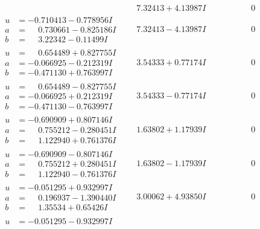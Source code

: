 \documentclass[1p]{elsarticle_modified}
\theoremstyle{definition}
\begin{document}
$$\begin{array}{c|c|c}
 & \phantom{-}7.32413 + 4.13987 I & \phantom{-0.000000 } 0 \\ \hline\begin{aligned}
u &= -0.710413 - 0.778956 I \\
a &= \phantom{-}0.730661 - 0.825186 I \\
b &= \phantom{-}3.22342 - 0.11499 I\end{aligned}
 & \phantom{-}7.32413 - 4.13987 I & \phantom{-0.000000 } 0 \\ \hline\begin{aligned}
u &= \phantom{-}0.654489 + 0.827755 I \\
a &= -0.066925 - 0.212319 I \\
b &= -0.471130 + 0.763997 I\end{aligned}
 & \phantom{-}3.54333 + 0.77174 I & \phantom{-0.000000 } 0 \\ \hline\begin{aligned}
u &= \phantom{-}0.654489 - 0.827755 I \\
a &= -0.066925 + 0.212319 I \\
b &= -0.471130 - 0.763997 I\end{aligned}
 & \phantom{-}3.54333 - 0.77174 I & \phantom{-0.000000 } 0 \\ \hline\begin{aligned}
u &= -0.690909 + 0.807146 I \\
a &= \phantom{-}0.755212 - 0.280451 I \\
b &= \phantom{-}1.122940 + 0.761376 I\end{aligned}
 & \phantom{-}1.63802 + 1.17939 I & \phantom{-0.000000 } 0 \\ \hline\begin{aligned}
u &= -0.690909 - 0.807146 I \\
a &= \phantom{-}0.755212 + 0.280451 I \\
b &= \phantom{-}1.122940 - 0.761376 I\end{aligned}
 & \phantom{-}1.63802 - 1.17939 I & \phantom{-0.000000 } 0 \\ \hline\begin{aligned}
u &= -0.051295 + 0.932997 I \\
a &= \phantom{-}0.196937 - 1.390440 I \\
b &= \phantom{-}1.35534 + 0.65426 I\end{aligned}
 & \phantom{-}3.00062 + 4.93850 I & \phantom{-0.000000 } 0 \\ \hline\begin{aligned}
u &= -0.051295 - 0.932997 I \\

\end{aligned}
\end{array}$$
\end{document}
